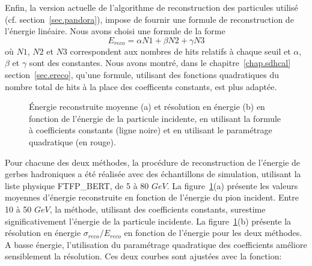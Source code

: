 Enfin, la version actuelle de l'algorithme de reconstruction des particules utilisé (cf. section~\ref{sec.pandora}), impose de fournir une formule de reconstruction de l'énergie linéaire. Nous avons choisi une formule de la forme
\begin{equation}
E_{reco}=\alpha N1 + \beta N2 + \gamma N3
\end{equation}
où $N1$, $N2$ et $N3$ correspondent aux nombres de hits relatifs à chaque seuil et $\alpha$, $\beta$ et $\gamma$ sont des constantes. Nous avons montré, dans le chapitre~\ref{chap.sdhcal} section~\ref{sec.ereco}, qu'une formule, utilisant des fonctions quadratiques du nombre total de hits à la place des coefficents constants, est plus adaptée.
\begin{figure}[!ht]
  \caption{Énergie reconstruite moyenne (a) et résolution en énergie (b) en fonction de l'énergie de la particule incidente, en utilisant la formule à coefficients constants (ligne noire) et en utilisant le paramétrage quadratique (en rouge).}
  \label{fig:sdhcal-erec-eres}
\end{figure}
Pour chacune des deux méthodes, la procédure de reconstruction de l'énergie de gerbes hadroniques a été réalisée avec des échantillons de simulation, utilisant la liste physique FTFP\_BERT, de 5 à 80 $GeV$. La figure~\ref{fig:sdhcal-erec-eres}(a) présente les valeurs moyennes d'énergie reconstruite en fonction de l'énergie du pion incident. Entre 10 à 50 $GeV$, la méthode, utilisant des coefficients constants, surestime significativement l'énergie de la particule incidente. La figure~\ref{fig:sdhcal-erec-eres}(b) présente la résolution en énergie $\sigma_{reco}/E_{reco}$ en fonction de l'énergie pour les deux méthodes. A basse énergie, l'utilisation du paramétrage quadratique des coefficients améliore sensiblement la résolution. Ces deux courbes sont ajustées avec la fonction:
